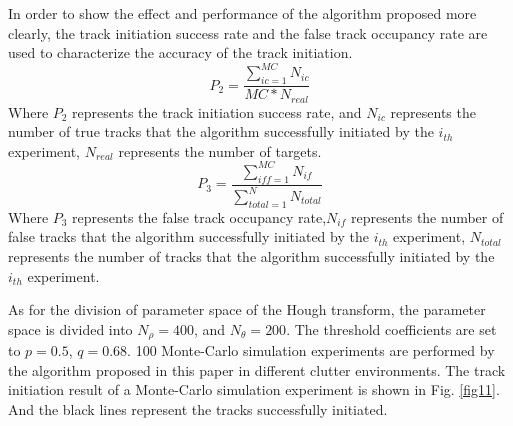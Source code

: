 \documentclass[default,iicol]{sn-jnl}%
\theoremstyle{thmstyleone}%
\theoremstyle{thmstyletwo}%
\theoremstyle{thmstylethree}%
\begin{document}
In order to show the effect and performance of the algorithm proposed more clearly, the track initiation success rate and the false track occupancy rate are used to characterize the accuracy of the track initiation.
\begin{equation}\label{eq18}
    P _ { 2 } = \frac { \sum _ { i c = 1 } ^ { M C } N _ { i c } } { M C * N _ { r e a l } }
\end{equation}
Where $P_{2}$ represents the track initiation success rate, and $N_{ic}$ represents the number of true tracks that the algorithm successfully initiated by the $i_{th}$ experiment, $N_{real}$ represents the number of targets.
\begin{equation}\label{eq19}
    P _ { 3 } = \frac { \sum _ { i f f = 1 } ^ { M C } N _ { i f } } { \sum _ { t o t a l = 1 } ^ { N } N _ { t o t a l } }
\end{equation}
Where $P_{3}$ represents the false track occupancy rate,$N_{if}$ represents the number of false tracks that the algorithm successfully initiated by the $i_{th}$ experiment, $N_{total}$ represents the number of tracks that the algorithm successfully initiated by the $i_{th}$ experiment.

As for the division of parameter space of the Hough transform, the parameter space is divided into $N_{\rho}\!=\!400$, and $N_{\theta}\!=\!200$. The threshold coefficients are set to $p\!=\!0.5$, $q\!=\!0.68$. 100 Monte-Carlo simulation experiments are performed by the algorithm proposed in this paper in different clutter environments. The track initiation result of a Monte-Carlo simulation experiment is shown in Fig. \ref{fig11}. And the black lines represent the tracks successfully initiated.
\end{document}
